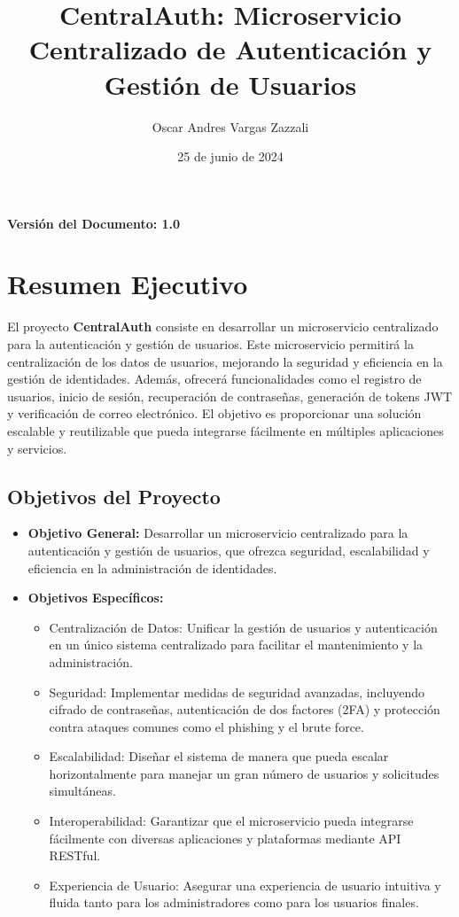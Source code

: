 \documentclass{article}
\title{CentralAuth: Microservicio Centralizado de Autenticación y Gestión de Usuarios}
\author{Oscar Andres Vargas Zazzali}
\date{25 de junio de 2024}
\begin{document}
\maketitle

\begin{center}
    \textbf{Versión del Documento: 1.0}
\end{center}
\newpage
\tableofcontents
\newpage

\section{Resumen Ejecutivo}

El proyecto \textbf{CentralAuth} consiste en desarrollar un microservicio centralizado para la autenticación y gestión de usuarios. Este microservicio permitirá la centralización de los datos de usuarios, mejorando la seguridad y eficiencia en la gestión de identidades. Además, ofrecerá funcionalidades como el registro de usuarios, inicio de sesión, recuperación de contraseñas, generación de tokens JWT y verificación de correo electrónico. El objetivo es proporcionar una solución escalable y reutilizable que pueda integrarse fácilmente en múltiples aplicaciones y servicios.

\subsection{Objetivos del Proyecto}

\begin{itemize}
    \item \textbf{Objetivo General:} Desarrollar un microservicio centralizado para la autenticación y gestión de usuarios, que ofrezca seguridad, escalabilidad y eficiencia en la administración de identidades.
    \item \textbf{Objetivos Específicos:}
          \begin{itemize}
              \item Centralización de Datos: Unificar la gestión de usuarios y autenticación en un único sistema centralizado para facilitar el mantenimiento y la administración.
              \item Seguridad: Implementar medidas de seguridad avanzadas, incluyendo cifrado de contraseñas, autenticación de dos factores (2FA) y protección contra ataques comunes como el phishing y el brute force.
              \item Escalabilidad: Diseñar el sistema de manera que pueda escalar horizontalmente para manejar un gran número de usuarios y solicitudes simultáneas.
              \item Interoperabilidad: Garantizar que el microservicio pueda integrarse fácilmente con diversas aplicaciones y plataformas mediante API RESTful.
              \item Experiencia de Usuario: Asegurar una experiencia de usuario intuitiva y fluida tanto para los administradores como para los usuarios finales.
          \end{itemize}
\end{itemize}
\end{document}
